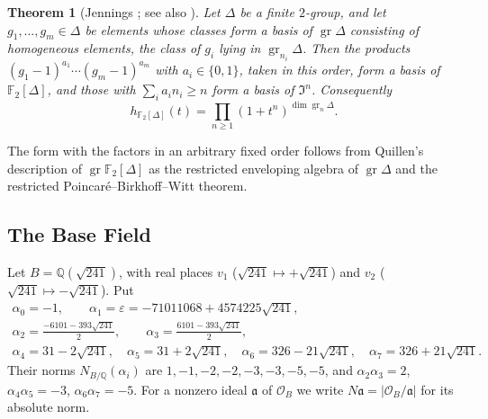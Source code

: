\documentclass[11pt]{amsart}
\numberwithin{equation}{section}
\newtheorem{theorem}[equation]{Theorem}
\theoremstyle{definition}
\theoremstyle{remark}
\newcommand{\Ftwo}{\mathbb F_2}
\newcommand{\Q}{\mathbb Q}
\begin{document}
\begin{theorem}[Jennings \cite{Jennings}; see also \cite{Quillen}]\label{tw:jennings}
Let $\Delta$ be a finite $2$-group, and let $g_1,\dots,g_m\in\Delta$ be
elements whose classes form a basis of $\operatorname{gr}\Delta$ consisting of
homogeneous elements, the class of $g_i$ lying in
$\operatorname{gr}_{n_i}\Delta$. Then the products
$(g_1-1)^{a_1}\cdots(g_m-1)^{a_m}$ with $a_i\in\{0,1\}$, taken in this order,
form a basis of $\Ftwo[\Delta]$, and those with $\sum_ia_in_i\ge n$ form a
basis of $\mathfrak I^n$. Consequently
\[
 h_{\Ftwo[\Delta]}(t)=\prod_{n\ge1}(1+t^n)^{\dim\operatorname{gr}_n\Delta}.
\]
\end{theorem}
The form with the factors in an arbitrary fixed order follows from
Quillen's description of $\operatorname{gr}\Ftwo[\Delta]$ as the restricted
enveloping algebra of $\operatorname{gr}\Delta$ \cite{Quillen} and the
restricted Poincar\'e--Birkhoff--Witt theorem.

\subsection{The Base Field}\label{tw:base-section}
Let $B=\Q(\sqrt{241})$, with real places $v_1$ ($\sqrt{241}\mapsto+\sqrt{241}$)
and $v_2$ ($\sqrt{241}\mapsto-\sqrt{241}$). Put
\begin{equation}\label{tw:alpha}
\begin{gathered}
 \alpha_0=-1,\qquad \alpha_1=\varepsilon=-71011068+4574225\sqrt{241},\\
 \alpha_2=\tfrac{-6101-393\sqrt{241}}2,\qquad
 \alpha_3=\tfrac{6101-393\sqrt{241}}2,\\
 \alpha_4=31-2\sqrt{241},\quad \alpha_5=31+2\sqrt{241},\quad
 \alpha_6=326-21\sqrt{241},\quad \alpha_7=326+21\sqrt{241}.
\end{gathered}
\end{equation}
Their norms $N_{B/\Q}(\alpha_i)$ are $1,-1,-2,-2,-3,-3,-5,-5$, and
$\alpha_2\alpha_3=2$, $\alpha_4\alpha_5=-3$, $\alpha_6\alpha_7=-5$. For a
nonzero ideal $\mathfrak a$ of $\mathcal O_B$ we write
$N\mathfrak a=|\mathcal O_B/\mathfrak a|$ for its absolute norm.
\end{document}
